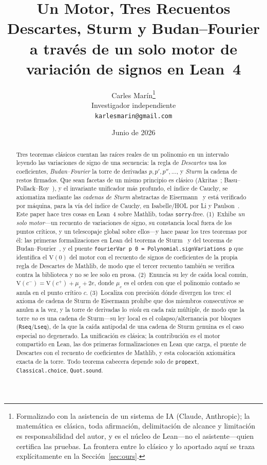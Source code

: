 \documentclass[11pt]{article}
\title{\bf Un Motor, Tres Recuentos\\[4pt]
  \large\normalfont Descartes, Sturm y Budan--Fourier a trav\'es de un solo motor de variaci\'on de
  signos en Lean~4}
\author{Carles Mar\'in\thanks{Formalizado con la asistencia de un sistema de IA (Claude, Anthropic);
la matem\'atica es cl\'asica, toda afirmaci\'on, delimitaci\'on de alcance y limitaci\'on es
responsabilidad del autor, y es el n\'ucleo de Lean---no el asistente---quien certifica las pruebas. La
frontera entre lo cl\'asico y lo aportado aqu\'i se traza expl\'icitamente en la
Secci\'on~\ref{sec:ours}.}\\[3pt]
  \normalsize Investigador independiente\\
  \normalsize \texttt{karlesmarin@gmail.com}}
\date{Junio de 2026}
\newcommand{\lean}[1]{{\def\_{\textunderscore\allowbreak}\texttt{#1}}}
\newcommand{\V}{\mathrm{V}}
\begin{document}
\maketitle

\begin{abstract}
Tres teoremas cl\'asicos cuentan las ra\'ices reales de un polinomio en un intervalo leyendo las
variaciones de signo de una secuencia: la regla de \emph{Descartes} usa los coeficientes,
\emph{Budan--Fourier} la torre de derivadas $p,p',p'',\dots$, y \emph{Sturm} la cadena de restos
firmados. Que sean facetas de un mismo principio es cl\'asico (Akritas~\cite{akritas};
Basu--Pollack--Roy~\cite{bpr}), y el invariante unificador m\'as profundo, el \'indice de Cauchy, se
axiomatiza mediante las \emph{cadenas de Sturm} abstractas de Eisermann~\cite{eisermann} y est\'a
verificado por m\'aquina, para la v\'ia del \'indice de Cauchy, en Isabelle/HOL por Li y
Paulson~\cite{liCauchy}. Este paper hace tres cosas en Lean~4 sobre Mathlib, todas \lean{sorry}-free.
(1)~Exhibe \emph{un solo motor}---un recuento de variaciones de signo, su constancia local fuera de los
puntos cr\'iticos, y un telescopaje global sobre ellos---y hace pasar los tres teoremas por \'el: las
primeras formalizaciones en Lean del teorema de Sturm~\cite{sturmlean} y del teorema de
Budan--Fourier~\cite{budanlean}, y el puente \lean{fourierVar p 0 = Polynomial.signVariations p} que
identifica el $\V(0)$ del motor con el recuento de signos de coeficientes de la propia regla de
Descartes de Mathlib, de modo que el tercer recuento tambi\'en se verifica contra la biblioteca y no
se lee solo en prosa. (2)~Enuncia su ley de ca\'ida local com\'un, $\V(c^-)=\V(c^+)+\mu_c+2e$, donde
$\mu_c$ es el orden con que el polinomio contado se anula en el punto cr\'itico $c$. (3)~Localiza con
precisi\'on d\'onde divergen los tres: el axioma de cadena de Sturm de Eisermann proh\'ibe que dos
miembros consecutivos se anulen a la vez, y la torre de derivadas lo \emph{viola} en cada ra\'iz
m\'ultiple, de modo que la torre \emph{no} es una cadena de Sturm---su ley local es el
colapso/alternancia por bloques (\lean{Rseq}/\lean{Lseq}), de la que la ca\'ida antipodal de una
cadena de Sturm genuina es el caso especial no degenerado. La unificaci\'on es cl\'asica; la
contribuci\'on es el motor compartido en Lean, las dos primeras formalizaciones en Lean que carga, el
puente de Descartes con el recuento de coeficientes de Mathlib, y esta colocaci\'on axiom\'atica exacta
de la torre. Todo teorema cabecera depende solo de \lean{propext}, \lean{Classical.choice},
\lean{Quot.sound}.
\end{abstract}
\end{document}
